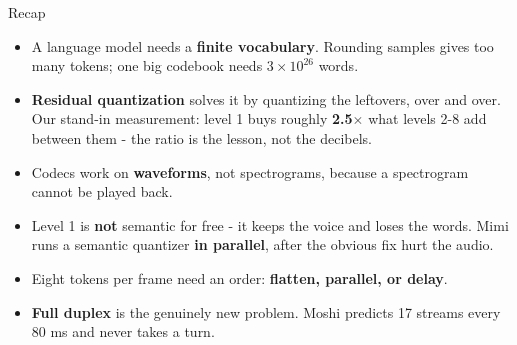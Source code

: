 \documentclass[aspectratio=169]{beamer}
\begin{document}
\begin{frame}{Recap}
  \small
  \begin{itemize}\itemsep4pt
    \item A language model needs a \textbf{finite vocabulary}. Rounding samples gives too many
      tokens; one big codebook needs $3 \times 10^{26}$ words.
    \item \textbf{Residual quantization} solves it by quantizing the leftovers, over and over.
      Our stand-in measurement: level 1 buys roughly \textbf{2.5$\times$} what levels 2-8 add
      between them - the ratio is the lesson, not the decibels.
    \item Codecs work on \textbf{waveforms}, not spectrograms, because a spectrogram cannot be
      played back.
    \item Level 1 is \textbf{not} semantic for free - it keeps the voice and loses the words.
      Mimi runs a semantic quantizer \textbf{in parallel}, after the obvious fix hurt the audio.
    \item Eight tokens per frame need an order: \textbf{flatten, parallel, or delay}.
    \item \textbf{Full duplex} is the genuinely new problem. Moshi predicts 17 streams every
      80 ms and never takes a turn.
  \end{itemize}
  \vskip 4pt
\end{frame}
\end{document}

